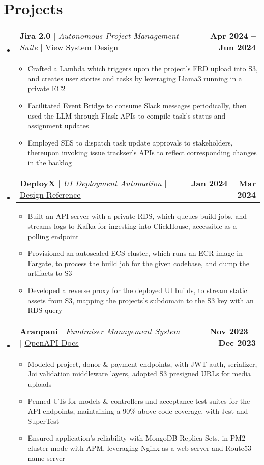 \documentclass[letterpaper,11pt]{article}
\makeatletter
\newcommand{\resumeItem}[1]{
  \item\small{
    {#1 \vspace{-2pt}}
  }
}
\newcommand{\resumeProjectHeading}[2]{
    \item
    \begin{tabular*}{1.001\textwidth}{l@{\extracolsep{\fill}}r}
      \small#1 & \textbf{\small #2}\\
    \end{tabular*}\vspace{-7pt}
}
\newcommand{\resumeSubHeadingListStart}{\begin{itemize}[leftmargin=0.0in, label={}]}
\newcommand{\resumeSubHeadingListEnd}{\end{itemize}}
\newcommand{\resumeItemListStart}{\begin{itemize}}
\newcommand{\resumeItemListEnd}{\end{itemize}\vspace{-5pt}}
\makeatother
\begin{document}
\section{Projects}
    \vspace{-5pt}
    \resumeSubHeadingListStart
      \resumeProjectHeading
          {\textbf{Jira 2.0} $|$ \textit{Autonomous Project Management Suite} $|$ \href{https://gist.github.com/kr-aashish/5d1b184bb082b29c0534861d07c2f25a}{\underline{View System Design}}}{Apr 2024 -- Jun 2024}
          \resumeItemListStart
            \resumeItem{Crafted a Lambda which triggers upon the project's FRD upload into S3, and creates user stories and tasks by leveraging Llama3 running in a private EC2}
            \resumeItem{Facilitated Event Bridge to consume Slack messages periodically, then used the LLM through Flask APIs to compile task's status and assignment updates}
            \resumeItem{Employed SES to dispatch task update approvals to stakeholders, thereupon invoking issue trackser's APIs to reflect corresponding changes in the backlog}
          \resumeItemListEnd
          \vspace{-13pt}
      \resumeProjectHeading
          {\textbf{DeployX} $|$ \textit{UI Deployment Automation} $|$ \href{https://vercel.com/blog/behind-the-scenes-of-vercels-infrastructure}{\underline{Design Reference}}}{Jan 2024 -- Mar 2024}
          \resumeItemListStart
            \resumeItem{Built an API server with a private RDS, which queues build jobs, and streams logs to Kafka for ingesting into ClickHouse, accessible as a polling endpoint}
            \resumeItem{Provisioned an auto\textendash scaled ECS cluster, which runs an ECR image in Fargate, to process the build job for the given codebase, and dump the artifacts to S3}
            \resumeItem{Developed a reverse proxy for the deployed UI builds, to stream static assets from S3, mapping the projects's subdomain to the S3 key with an RDS query}
          \resumeItemListEnd
          \vspace{-13pt}
      \resumeProjectHeading
          {\textbf{Aranpani} $|$ \textit{Fundraiser Management System} $|$ \href{https://kr-aashish.github.io/aranpani-api-docs}{\underline{OpenAPI Docs}}}{Nov 2023 -- Dec 2023}
          \resumeItemListStart
            \resumeItem{Modeled project, donor \& payment endpoints, with JWT auth, serializer, Joi validation middleware layers, adopted S3 pre\textendash signed URLs for media uploads}
            \resumeItem{Penned UTs for models \& controllers and acceptance test suites for the API endpoints, maintaining a 90\% above code coverage, with Jest and SuperTest}
            \resumeItem{Ensured application's reliability with MongoDB Replica Sets, in PM2 cluster mode with APM, leveraging Nginx as a web server and Route53 name server}
          \resumeItemListEnd
    \resumeSubHeadingListEnd
\vspace{-15pt}
\end{document}
